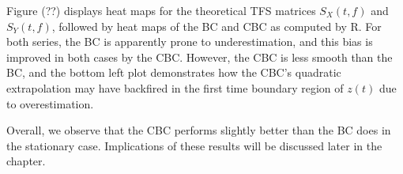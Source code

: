 \documentclass{article}
\begin{document}
Figure (??) displays heat maps for the theoretical TFS matrices $S_X(t,f)$ and $S_Y(t,f)$, followed by heat maps of the BC and CBC as computed by R. For both series, the BC is apparently prone to underestimation, and this bias is improved in both cases by the CBC. However, the CBC is less smooth than the BC, and the bottom left plot demonstrates how the CBC's quadratic extrapolation may have backfired in the first time boundary region of $z(t)$ due to overestimation.

Overall, we observe that the CBC performs slightly better than the BC does in the stationary case. Implications of these results will be discussed later in the chapter.


\end{document}
